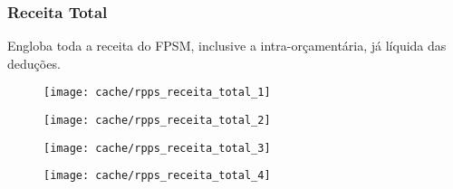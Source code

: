 
\subsubsection{Receita Total}

Engloba toda a receita do FPSM, inclusive a intra-orçamentária, já líquida das deduções.





\begin{figure}[H]
\center
\texttt{[image: cache/rpps\_receita\_total\_1]}
\end{figure}

\begin{figure}[H]
\center
\texttt{[image: cache/rpps\_receita\_total\_2]}
\end{figure}

\begin{figure}[H]
\center
\texttt{[image: cache/rpps\_receita\_total\_3]}
\end{figure}

\begin{figure}[H]
\center
\texttt{[image: cache/rpps\_receita\_total\_4]}
\end{figure}